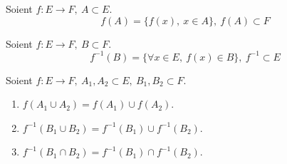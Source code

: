 \begin{definition}
    Soient $f : E \to F,\ A \subset E$.
	\[ f(A) = \{ f(x),\ x \in A \},\ f(A) \subset F \]
\end{definition}

\begin{definition}
	Soient $f : E \to F,\ B \subset F$.
	\[ f^{-1}(B) = \{ \forall x \in E,\ f(x) \in B \},\ f^{-1} \subset E \]
\end{definition}

\begin{proposition}
    Soient $f : E \to F,\ A_1, A_2 \subset E,\ B_1, B_2 \subset F$.
    \begin{enumerate}
        \item $f(A_1 \cup A_2) = f(A_1) \cup f(A_2)$.
        \item $f^{-1} (B_1 \cup B_2) = f^{-1} (B_1) \cup f^{-1} (B_2)$.
        \item $f^{-1} (B_1 \cap B_2) = f^{-1} (B_1) \cap f^{-1} (B_2)$.
    \end{enumerate}
\end{proposition} 


